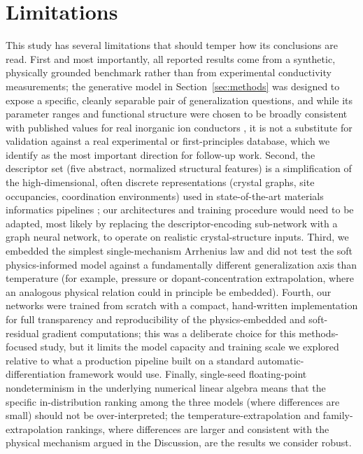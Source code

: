 \documentclass[11pt]{article}
\begin{document}
\section{Limitations}

This study has several limitations that should temper how its conclusions are read. First and most importantly, all reported results come from a synthetic, physically grounded benchmark rather than from experimental conductivity measurements; the generative model in Section~\ref{sec:methods} was designed to expose a specific, cleanly separable pair of generalization questions, and while its parameter ranges and functional structure were chosen to be broadly consistent with published values for real inorganic ion conductors \citep{famprikis2019fundamentals}, it is not a substitute for validation against a real experimental or first-principles database, which we identify as the most important direction for follow-up work. Second, the descriptor set (five abstract, normalized structural features) is a simplification of the high-dimensional, often discrete representations (crystal graphs, site occupancies, coordination environments) used in state-of-the-art materials informatics pipelines \citep{xie2018cgcnn}; our architectures and training procedure would need to be adapted, most likely by replacing the descriptor-encoding sub-network with a graph neural network, to operate on realistic crystal-structure inputs. Third, we embedded the simplest single-mechanism Arrhenius law and did not test the soft physics-informed model against a fundamentally different generalization axis than temperature (for example, pressure or dopant-concentration extrapolation, where an analogous physical relation could in principle be embedded). Fourth, our networks were trained from scratch with a compact, hand-written implementation for full transparency and reproducibility of the physics-embedded and soft-residual gradient computations; this was a deliberate choice for this methods-focused study, but it limits the model capacity and training scale we explored relative to what a production pipeline built on a standard automatic-differentiation framework would use. Finally, single-seed floating-point nondeterminism in the underlying numerical linear algebra means that the specific in-distribution ranking among the three models (where differences are small) should not be over-interpreted; the temperature-extrapolation and family-extrapolation rankings, where differences are larger and consistent with the physical mechanism argued in the Discussion, are the results we consider robust.
\end{document}
